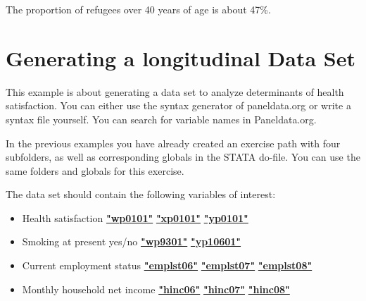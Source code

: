 \documentclass[letterpaper,10pt,openany,onesideH,english]{sphinxmanual}
\begin{document}
\begin{figure}[H]
\centering

\noindent{}
\end{figure}

The proportion of refugees over 40 years of age is about 47\%.


\section{Generating a longitudinal Data Set}
\label{\detokenize{Working with SOEP Data/index:generating-a-longitudinal-data-set}}
This example is about generating a data set to analyze determinants of health satisfaction. You can either use the syntax generator of paneldata.org or write a syntax file yourself. You can search for variable names in Paneldata.org.

In the previous examples you have already created an exercise path with four subfolders, as well as corresponding globals in the STATA do-file. You can use the same folders and globals for this exercise.


The data set should contain the following variables of interest:
\begin{itemize}
\item {} 
Health satisfaction  \href{https://paneldata.org/soep-core/data/wp/wp0101}{\textbf{"wp0101"}}  \href{https://paneldata.org/soep-core/data/xp/xp0101}{\textbf{"xp0101"}}  \href{https://paneldata.org/soep-core/data/yp/yp0101}{\textbf{"yp0101"}}

\item {} 
Smoking at present yes/no  \href{https://paneldata.org/soep-core/data/wp/wp9301}{\textbf{"wp9301"}}  \href{https://paneldata.org/soep-core/data/yp/yp10601}{\textbf{"yp10601"}}

\item {} 
Current employment status  \href{https://paneldata.org/soep-core/data/wpgen/emplst06}{\textbf{"emplst06"}}  \href{https://paneldata.org/soep-core/data/xpgen/emplst07}{\textbf{"emplst07"}}  \href{https://paneldata.org/soep-core/data/ypgen/emplst08}{\textbf{"emplst08"}}

\item {} 
Monthly household net income  \href{https://paneldata.org/soep-core/data/whgen/hinc06}{\textbf{"hinc06"}}  \href{https://paneldata.org/soep-core/data/xhgen/hinc07}{\textbf{"hinc07"}}  \href{https://paneldata.org/soep-core/data/yhgen/hinc08}{\textbf{"hinc08"}}

\end{itemize}
\end{document}
